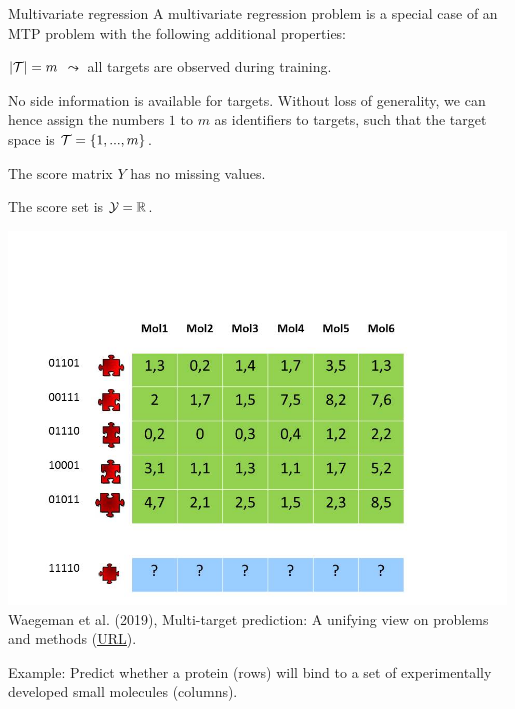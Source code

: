 \begin{frame}{Multivariate regression}
	\small
% 
		A multivariate regression problem is a special case of an MTP problem with the following additional properties: 
%		
		\begin{enumerate}\small
%			
			\item[P5] $|\mathcal{T}|=m$ $\leadsto$ all targets are observed during training. 
%			
			\item[P6] No side information is available for targets. Without loss of generality, we can hence assign the numbers $1$ to $m$ as identifiers to targets, such that the target space is $\mathcal{T} = \{1,...,m\}$. 
%			
			
			\begin{minipage}{0.45\textwidth}    
%				
			\item[P7] The score matrix $Y$ has no missing values. 
%			
			\item[P8a] The score set is $\mathcal{Y} = \mathbb{R}$. 
%			
				\end{minipage}
			\begin{minipage}{0.45\textwidth}    
				\begin{center}
				\includegraphics[width=0.99\textwidth,trim = 0 0 100 100,clip]{figure/Slide1} 	\tiny
				\\ Waegeman et al. (2019), Multi-target prediction:
				A unifying view on problems and methods (\href{https://arxiv.org/pdf/1809.02352.pdf}{\underline{URL}}).
					\end{center}
			\end{minipage}
		\end{enumerate}
%	
	Example: Predict whether a protein (rows) will bind to a set of experimentally developed small molecules (columns).
%
\end{frame}





